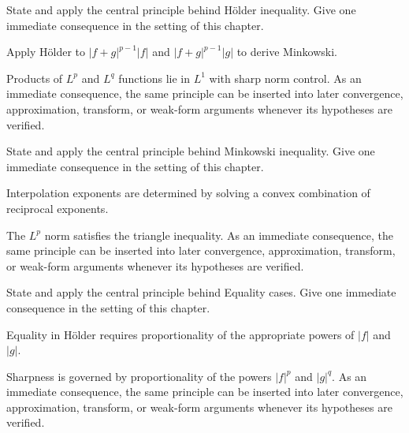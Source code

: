 \begin{exercise}\label{exr:iii07-03}
State and apply the central principle behind Hölder inequality. Give one immediate consequence in the setting of this chapter.
\end{exercise}
\begin{hint}
Apply Hölder to \(|f+g|^{p-1}|f|\) and \(|f+g|^{p-1}|g|\) to derive Minkowski.
\end{hint}
\begin{solution}
Products of $L^p$ and $L^q$ functions lie in $L^1$ with sharp norm control. As an immediate consequence, the same principle can be inserted into later convergence, approximation, transform, or weak-form arguments whenever its hypotheses are verified.
\end{solution}

\begin{exercise}\label{exr:iii07-04}
State and apply the central principle behind Minkowski inequality. Give one immediate consequence in the setting of this chapter.
\end{exercise}
\begin{hint}
Interpolation exponents are determined by solving a convex combination of reciprocal exponents.
\end{hint}
\begin{solution}
The $L^p$ norm satisfies the triangle inequality. As an immediate consequence, the same principle can be inserted into later convergence, approximation, transform, or weak-form arguments whenever its hypotheses are verified.
\end{solution}

\begin{exercise}\label{exr:iii07-05}
State and apply the central principle behind Equality cases. Give one immediate consequence in the setting of this chapter.
\end{exercise}
\begin{hint}
Equality in Hölder requires proportionality of the appropriate powers of \(|f|\) and \(|g|\).
\end{hint}
\begin{solution}
Sharpness is governed by proportionality of the powers $|f|^p$ and $|g|^q$. As an immediate consequence, the same principle can be inserted into later convergence, approximation, transform, or weak-form arguments whenever its hypotheses are verified.
\end{solution}

